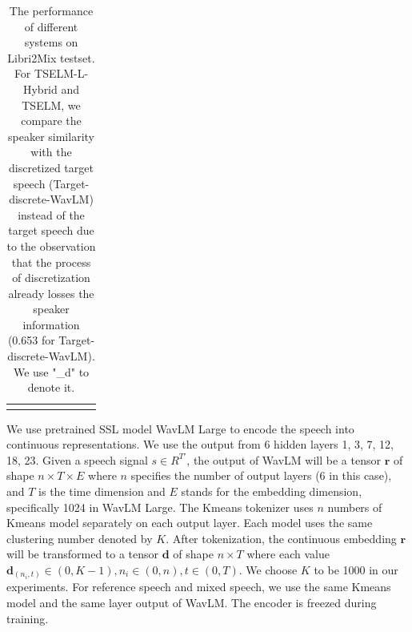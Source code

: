 \documentclass[conference]{IEEEtran}
\begin{document}
\begin{table}
\begin{center}
\begin{tabular}{cccccccc}
            \Xhline{2\arrayrulewidth} %
            \end{tabular}
            \linebreak
            \caption{The performance of different systems on Libri2Mix testset. For TSELM-L-Hybrid  
            and TSELM, we compare the speaker similarity with the discretized target speech 
            (Target-discrete-WavLM) instead of the target speech due to the observation that 
            the process of discretization already losses the speaker information (0.653 for 
            Target-discrete-WavLM). We use "\_d" to denote it.  }
            \label{main_exp}
      \end{center}
  \end{table}

We use pretrained SSL model WavLM Large \cite{wavlm} to 
encode the speech into continuous representations. We use the output from 6 hidden 
layers 1, 3, 7, 12, 18, 23. Given a speech signal \(s \in R^{T'} \), the output 
of WavLM will be a tensor \(\bm{r}\) of shape \(n \times T \times E\) where 
\(n\) specifies the number 
of output layers (6 in this case), and  \(T\) is the time 
dimension and \(E\) stands for the 
embedding dimension, specifically 1024 in WavLM Large. The Kmeans tokenizer uses \(n\) numbers of  Kmeans model 
separately on each output layer. Each model uses the same clustering number denoted by \(K\).
After tokenization, the continuous embedding \(\bm{r}\) will be transformed to a tensor \(\bm{d}\) of shape \(n \times T\) where each value \(\bm{d}_{(n_i,t)} \in (0, K-1), n_i \in (0,n), t \in 
(0, T)\). We choose \(K\) to be 1000 in our experiments. For reference speech and mixed speech, we 
use the same Kmeans model and the same layer output of WavLM. The encoder is freezed during training.
\end{document}
